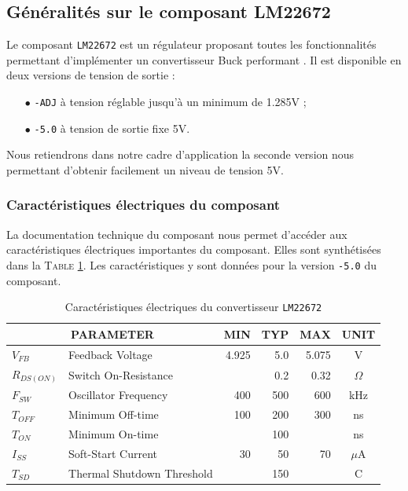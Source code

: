 		\subsection{Généralités sur le composant LM22672}
		
		Le composant \texttt{LM22672} est un régulateur proposant toutes 
		les fonctionnalités permettant d'implémenter un convertisseur 
		Buck performant \cite{LM22672}. Il est disponible en deux versions 
		de tension de sortie :
		\begin{itemize}
			\item[$\bullet$]	\texttt{-ADJ} à tension réglable jusqu'à un minimum
							 	de 1.285V ;
			\item[$\bullet$]	\texttt{-5.0} à tension de sortie fixe 5V.			 
		\end{itemize}
		Nous retiendrons dans notre cadre d'application la seconde version
		nous permettant d'obtenir facilement un niveau de tension 5V.
			
			\subsubsection{Caractéristiques électriques du composant}
			
			La documentation technique du composant nous permet d'accéder aux
			caractéristiques électriques importantes du composant. Elles sont
			synthétisées dans la \textsc{Table \ref{carac_elec_lm22672}}.
			Les caractéristiques y sont données pour la version \texttt{-5.0}
			du composant.
			
			\begin{table}[h]
				\begin{center}
					\begin{tabular}{|l l | r r r | c|}
					\hline
					\multicolumn{2}{|c|}{\textbf{PARAMETER}}	& \textbf{MIN}	& \textbf{TYP}	
																& \textbf{MAX}	& \textbf{UNIT}\\
					\hline
					$V_{FB}$		&	Feedback Voltage		& 4.925	&	5.0	& 5.075	&	V			\\
					\hline
					$R_{DS(ON)}$ 	& 	Switch On-Resistance 	&		&	0.2	&  0.32	&	$\Omega$	\\
					\hline
					$F_{SW}$		&	Oscillator Frequency	&	400	&	500	&	600	&	kHz			\\
					\hline
					$T_{OFF}$		&	Minimum Off-time		&	100	&	200	&	300	&	ns			\\
					\hline
					$T_{ON}$		&	Minimum On-time			&		&	100	&		&	ns			\\
					\hline
					$I_{SS}$		& 	Soft-Start Current		&	30	&	50	&	70	&	$\mu$A		\\
					\hline
					$T_{SD}$		& 	Thermal Shutdown Threshold	&	&	150	&		&	\degre C	\\
					\hline
				\end{tabular}				
				\end{center}	
				\caption{Caractéristiques électriques du convertisseur \texttt{LM22672} \cite{LM22672}}
				\label{carac_elec_lm22672}
			\end{table}
			
